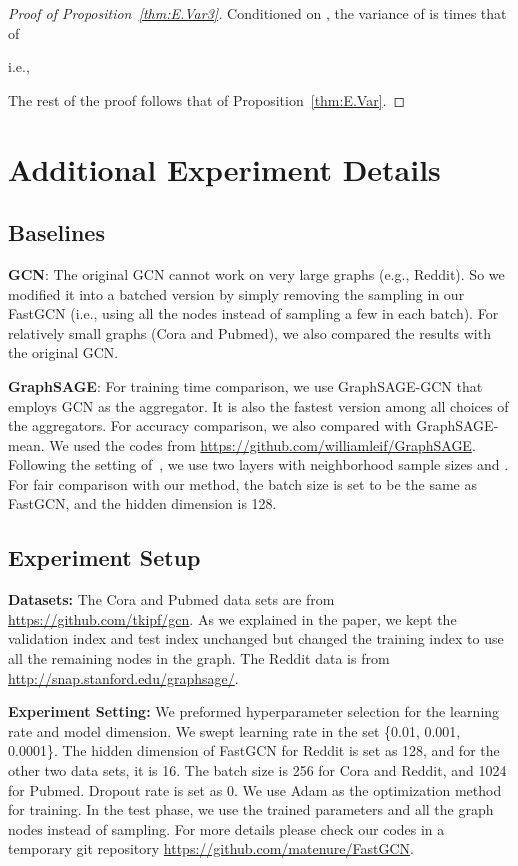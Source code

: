 \documentclass{article} \usepackage{iclr2018_conference,times}
\theoremstyle{plain}\newtheorem{theorem}{Theorem}\theoremstyle{plain}\newtheorem{proposition}[theorem]{Proposition}
\theoremstyle{plain}\newtheorem{corollary}[theorem]{Corollary}
\theoremstyle{plain}\newtheorem{lemma}[theorem]{Lemma}
\begin{document}
\begin{proof}[Proof of Proposition~\ref{thm:E.Var3}]
Conditioned on , the variance of  is  times that of

i.e.,

The rest of the proof follows that of Proposition~\ref{thm:E.Var}.
\end{proof}



\section{Additional Experiment Details}

\subsection{Baselines}
{\bf GCN}: The original GCN cannot work on very large graphs (e.g., Reddit). So we modified it into a batched version by simply removing the sampling in our FastGCN (i.e., using all the nodes instead of sampling a few in each batch). 
For relatively small graphs (Cora and Pubmed), we also compared the results with the original GCN.

{\bf GraphSAGE}: For training time comparison, we use GraphSAGE-GCN that employs GCN as the aggregator. It is also the fastest version among all choices of the aggregators. For accuracy comparison, we also compared with GraphSAGE-mean. We used the codes from \url{https://github.com/williamleif/GraphSAGE}. Following the setting of~\cite{DBLP:journals/corr/HamiltonYL17}, we use two layers with neighborhood sample sizes  and . For fair comparison with our method, the batch size is set to be the same as FastGCN, and the hidden dimension is 128.

\subsection{Experiment Setup}
{\bf Datasets:}
The Cora and Pubmed data sets are from \url{https://github.com/tkipf/gcn}. As we explained in the paper, we kept the validation index and test index unchanged but changed the training index to use all the remaining nodes in the graph. The Reddit data is from \url{http://snap.stanford.edu/graphsage/}.

{\bf Experiment Setting:}
We preformed hyperparameter selection for the learning rate and model dimension. We swept learning rate in the set \{0.01, 0.001, 0.0001\}. The hidden dimension of FastGCN for Reddit is set as 128, and for the other two data sets, it is 16. The batch size is 256 for Cora and Reddit, and 1024 for Pubmed. Dropout rate is set as 0. We use Adam as the optimization method for training. In the test phase, we use the trained parameters and all the graph nodes instead of sampling. For more details please check our codes in a temporary git repository \url{https://github.com/matenure/FastGCN}.
\end{document}
